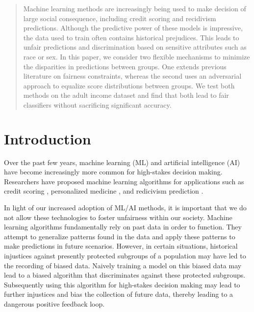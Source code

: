 \documentclass{article}
\begin{document}
\begin{abstract}
	Machine learning methods are increasingly being used to make decision of large social consequence, including credit scoring and recidivism predictions. Although the predictive power of these models is impressive, the data used to train often contains historical prejudices. This leads to unfair predictions and discrimination based on sensitive attributes such as race or sex. In this paper, we consider two flexible mechanisms to minimize the disparities in predictions between groups. One extends previous literature on fairness constraints, whereas the second uses an adversarial approach to equalize score distributions between groups. We test both methods on the adult income dataset and find that both lead to fair classifiers without sacrificing significant accuracy.
\end{abstract}

\section{Introduction}
\label{submission}

Over the past few years, machine learning (ML) and artificial intelligence (AI) have become increasingly more common for high-stakes decision making.  Researchers have proposed machine learning algorithms for applications such as credit scoring \citep{huang2007credit}, personalized medicine \citep{poplin2018prediction}, and redicivism prediction \citep{tollenaar2013method}.  

In light of our increased adoption of ML/AI methods, it is important that we do not allow these technologies to foster unfairness within our society.  Machine learning algorithms fundamentally rely on past data in order to function.   They attempt to generalize patterns found in the data and apply these patterns to make predictions in future scenarios.  However, in certain situations, historical injustices against presently protected subgroups of a population may have led to the recording of biased data.  Naively training a model on this biased data may lead to a biased algorithm that discriminates against these protected subgroups.  Subsequently using this algorithm for high-stakes decision making may lead to further injustices and bias the collection of future data, thereby leading to a dangerous positive feedback loop.  
\end{document}
